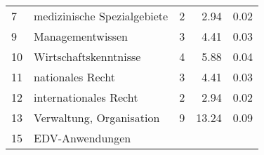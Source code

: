 \begin{longtable}{lXrrr}
     7 &
     \multicolumn{1}{X}{ medizinische Spezialgebiete   } &


       \num{2} &
       \num[round-mode=places,round-precision=2]{2.94} &
         \num[round-mode=places,round-precision=2]{0.02} \\

     9 &
     \multicolumn{1}{X}{ Managementwissen   } &


       \num{3} &
       \num[round-mode=places,round-precision=2]{4.41} &
         \num[round-mode=places,round-precision=2]{0.03} \\

     10 &
     \multicolumn{1}{X}{ Wirtschaftskenntnisse   } &


       \num{4} &
       \num[round-mode=places,round-precision=2]{5.88} &
         \num[round-mode=places,round-precision=2]{0.04} \\

     11 &
     \multicolumn{1}{X}{ nationales Recht   } &


       \num{3} &
       \num[round-mode=places,round-precision=2]{4.41} &
         \num[round-mode=places,round-precision=2]{0.03} \\

     12 &
     \multicolumn{1}{X}{ internationales Recht   } &


       \num{2} &
       \num[round-mode=places,round-precision=2]{2.94} &
         \num[round-mode=places,round-precision=2]{0.02} \\

     13 &
     \multicolumn{1}{X}{ Verwaltung, Organisation   } &


       \num{9} &
       \num[round-mode=places,round-precision=2]{13.24} &
         \num[round-mode=places,round-precision=2]{0.09} \\

     15 &
     \multicolumn{1}{X}{ EDV-Anwendungen   } &



\end{longtable}
